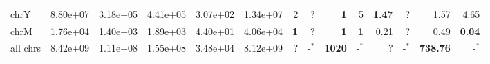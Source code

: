\begin{table*}[!ht]
\begin{tabular}{@{}lrrrrrrrrrrrrr@{}}
		chrY & 8.80e+07 & 3.18e+05 & 4.41e+05 & 3.07e+02 & 1.34e+07 & 2 & ? & \textbf{1} & 5 & \textbf{1.47} & ? & 1.57 & 4.65 \\ 
		chrM & 1.76e+04 & 1.40e+03 & 1.89e+03 & 4.40e+01 & 4.06e+04 & \textbf{1} & ? & \textbf{1} & \textbf{1} & 0.21 & ? & 0.49 & \textbf{0.04}  \\ 
		all chrs & 8.42e+09 & 1.11e+08 & 1.55e+08 & 3.48e+04 & 8.12e+09 & ? & -$^{*}$ & \textbf{1020} & -$^{*}$  & ? & -$^{*}$ & \textbf{738.76} & -$^{*}$ \\
		\bottomrule
	\end{tabular}
\end{table*}